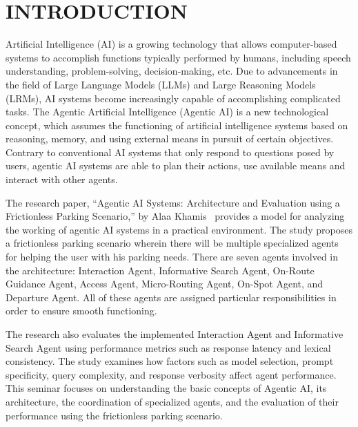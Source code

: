 \documentclass[12pt,a4paper]{report}
\begin{document}
\begingroup
\singlespacing
\renewcommand{\contentsname}{INDEX}
\tableofcontents
\clearpage
\renewcommand{\listfigurename}{LIST OF FIGURES}
\listoffigures
\endgroup
\clearpage

\setcounter{page}{1}
\onehalfspacing

\chapter{INTRODUCTION}
Artificial Intelligence (AI) is a growing technology that allows computer-based systems to accomplish functions typically performed by humans, including speech understanding, problem-solving, decision-making, etc. Due to advancements in the field of Large Language Models (LLMs) and Large Reasoning Models (LRMs), AI systems become increasingly capable of accomplishing complicated tasks. The Agentic Artificial Intelligence (Agentic AI) is a new technological concept, which assumes the functioning of artificial intelligence systems based on reasoning, memory, and using external means in pursuit of certain objectives. Contrary to conventional AI systems that only respond to questions posed by users, agentic AI systems are able to plan their actions, use available means and interact with other agents.

The research paper, ``Agentic AI Systems: Architecture and Evaluation using a Frictionless Parking Scenario,'' by Alaa Khamis~\cite{ref1} provides a model for analyzing the working of agentic AI systems in a practical environment. The study proposes a frictionless parking scenario wherein there will be multiple specialized agents for helping the user with his parking needs. There are seven agents involved in the architecture: Interaction Agent, Informative Search Agent, On-Route Guidance Agent, Access Agent, Micro-Routing Agent, On-Spot Agent, and Departure Agent. All of these agents are assigned particular responsibilities in order to ensure smooth functioning.

The research also evaluates the implemented Interaction Agent and Informative Search Agent using performance metrics such as response latency and lexical consistency. The study examines how factors such as model selection, prompt specificity, query complexity, and response verbosity affect agent performance. This seminar focuses on understanding the basic concepts of Agentic AI, its architecture, the coordination of specialized agents, and the evaluation of their performance using the frictionless parking scenario.
\end{document}
